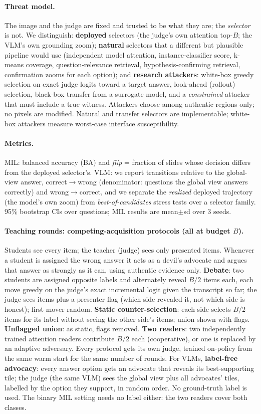 \documentclass[10pt,twocolumn,letterpaper]{article}
\begin{document}
\paragraph{Threat model.} The image and the judge are fixed and trusted to be what they are; the \emph{selector} is not. We distinguish: \textbf{deployed} selectors (the judge's own attention top-$B$; the VLM's own grounding zoom); \textbf{natural} selectors that a different but plausible pipeline would use (independent model attention, instance-classifier score, k-means coverage, question-relevance retrieval, hypothesis-confirming retrieval, confirmation zooms for each option); and \textbf{research attackers}: white-box greedy selection on exact judge logits toward a target answer, look-ahead (rollout) selection, black-box transfer from a surrogate model, and a \emph{constrained} attacker that must include a true witness. Attackers choose among authentic regions only; no pixels are modified. Natural and transfer selectors are implementable; white-box attackers measure worst-case interface susceptibility.
\paragraph{Metrics.} MIL: balanced accuracy (BA) and \emph{flip} = fraction of slides whose decision differs from the deployed selector's. VLM: we report transitions relative to the global-view answer, correct$\to$wrong (denominator: questions the global view answers correctly) and wrong$\to$correct, and we separate the \emph{realized} deployed trajectory (the model's own zoom) from \emph{best-of-candidates} stress tests over a selector family. 95\% bootstrap CIs over questions; MIL results are mean$\pm$sd over 3 seeds.
\paragraph{Teaching rounds: competing-acquisition protocols (all at budget $B$).} Students see every item; the teacher (judge) sees only presented items. Whenever a student is assigned the wrong answer it acts as a devil's advocate and argues that answer as strongly as it can, using authentic evidence only. \textbf{Debate}: two students are assigned opposite labels and alternately reveal $B/2$ items each, each move greedy on the judge's exact incremental logit given the transcript so far; the judge sees items plus a presenter flag (which side revealed it, not which side is honest); first mover random. \textbf{Static counter-selection}: each side selects $B/2$ items for its label without seeing the other side's items; union shown with flags. \textbf{Unflagged union}: as static, flags removed. \textbf{Two readers}: two independently trained attention readers contribute $B/2$ each (cooperative), or one is replaced by an adaptive adversary. Every protocol gets its own judge, trained on-policy from the same warm start for the same number of rounds. For VLMs, \textbf{label-free advocacy}: every answer option gets an advocate that reveals its best-supporting tile; the judge (the same VLM) sees the global view plus all advocates' tiles, labelled by the option they support, in random order. No ground-truth label is used. The binary MIL setting needs no label either: the two readers cover both classes.
\end{document}
